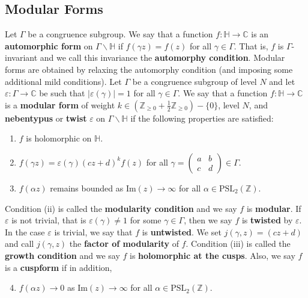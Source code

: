 \documentclass[12pt]{book}
\theoremstyle{definition}\newframedtheorem{method}{Method}
\newcommand{\PSL}{\mathrm{PSL}}
\newcommand{\Z}{\mathbb{Z}}
\newcommand{\C}{\mathbb{C}}
\renewcommand{\H}{\mathbb{H}}
\renewcommand{\a}{\alpha}
\newcommand{\g}{\gamma}
\newcommand{\G}{\Gamma}
\newcommand{\e}{\varepsilon}
\newcommand{\<}{\langle}
\renewcommand{\>}{\rangle}
\renewcommand{\Im}{\mathrm{Im}}
\newcommand{\GH}{\G\backslash\H}
\begin{document}
    \subsection*{Modular Forms}
      Let $\G$ be a congruence subgroup. We say that a function $f:\H \to \C$ is an \textbf{automorphic form} on $\G\backslash\H$ if $f(\g z) = f(z)$ for all $\g \in \G$. That is, $f$ is $\G$-invariant and we call this invariance the \textbf{automorphy condition}. Modular forms are obtained by relaxing the automorphy condition (and imposing some additional mild conditions). Let $\G$ be a congruence subgroup of level $N$ and let $\e:\G \to \C$ be such that $|\e(\g)| = 1$ for all $\g \in \G$. We say that a function $f:\H \to \C$ is a \textbf{modular form} of weight $k \in \left(\Z_{\ge 0}+\frac{1}{2}\Z_{\ge 0}\right)-\{0\}$, level $N$, and \textbf{nebentypus} or \textbf{twist} $\e$ on $\GH$ if the following properties are satisfied:
      \begin{enumerate}[label=(\roman*)]
        \item $f$ is holomorphic on $\H$.
        \item $f(\g z) = \e(\g)(cz+d)^{k}f(z)$ for all $\g = \begin{pmatrix} a & b \\ c & d \end{pmatrix} \in \G$.
        \item $f(\a z)$ remains bounded as $\Im(z) \to \infty$ for all $\a \in \PSL_{2}(\Z)$.
      \end{enumerate}
      Condition (ii) is called the \textbf{modularity condition} and we say $f$ is \textbf{modular}. If $\e$ is not trivial, that is $\e(\g) \neq 1$ for some $\g \in \G$, then we say $f$ is \textbf{twisted} by $\e$. In the case $\e$ is trivial, we say that $f$ is \textbf{untwisted}. We set $j(\g,z) = (cz+d)$ and call $j(\g,z)$ the \textbf{factor of modularity} of $f$. Condition (iii) is called the \textbf{growth condition} and we say $f$ is \textbf{holomorphic at the cusps}. Also, we say $f$ is a \textbf{cuspform} if in addition,
      \begin{enumerate}[label=(\roman*)]
        \setcounter{enumi}{3}
        \item $f(\a z) \to 0$ as $\Im(z) \to \infty$ for all $\a \in \PSL_{2}(\Z)$.
      \end{enumerate}
\end{document}
